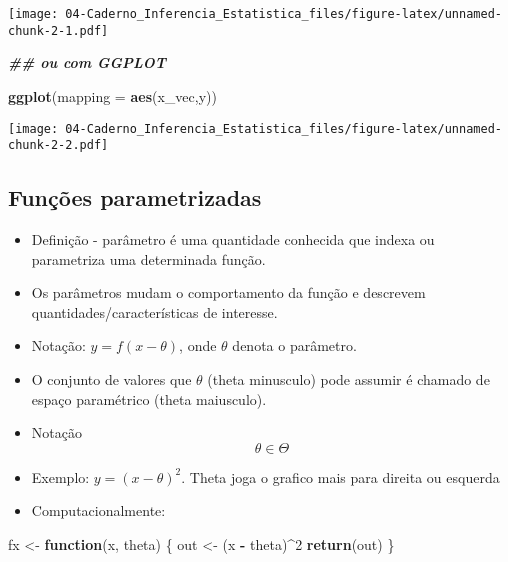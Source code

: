 \documentclass[
]{article}
\newenvironment{Shaded}{\begin{snugshade}}{\end{snugshade}}
\newcommand{\AttributeTok}[1]{\textcolor[rgb]{0.13,0.29,0.53}{#1}}
\newcommand{\ControlFlowTok}[1]{\textcolor[rgb]{0.13,0.29,0.53}{\textbf{#1}}}
\newcommand{\DecValTok}[1]{\textcolor[rgb]{0.00,0.00,0.81}{#1}}
\newcommand{\DocumentationTok}[1]{\textcolor[rgb]{0.56,0.35,0.01}{\textbf{\textit{#1}}}}
\newcommand{\FunctionTok}[1]{\textcolor[rgb]{0.13,0.29,0.53}{\textbf{#1}}}
\newcommand{\NormalTok}[1]{#1}
\newcommand{\OtherTok}[1]{\textcolor[rgb]{0.56,0.35,0.01}{#1}}
\newcommand{\SpecialCharTok}[1]{\textcolor[rgb]{0.81,0.36,0.00}{\textbf{#1}}}
\providecommand{\tightlist}{%
  \setlength{\itemsep}{0pt}\setlength{\parskip}{0pt}}
\begin{document}
\texttt{[image: 04-Caderno\_Inferencia\_Estatistica\_files/figure-latex/unnamed-chunk-2-1.pdf]}

\begin{Shaded}
\begin{Highlighting}[]
\DocumentationTok{\#\# ou com GGPLOT}

\FunctionTok{ggplot}\NormalTok{(}\AttributeTok{mapping =} \FunctionTok{aes}\NormalTok{(x\_vec,y))}
\end{Highlighting}
\end{Shaded}

\texttt{[image: 04-Caderno\_Inferencia\_Estatistica\_files/figure-latex/unnamed-chunk-2-2.pdf]}

\hypertarget{funuxe7uxf5es-parametrizadas}{%
\subsection{Funções parametrizadas}\label{funuxe7uxf5es-parametrizadas}}

\begin{itemize}
\tightlist
\item
  Definição - parâmetro é uma quantidade conhecida que indexa ou
  parametriza uma determinada função.
\item
  Os parâmetros mudam o comportamento da função e descrevem
  quantidades/características de interesse.
\item
  Notação: \(y = f(x - \theta)\), onde \(\theta\) denota o parâmetro.
\item
  O conjunto de valores que \(\theta\) (theta minusculo) pode assumir é
  chamado de espaço paramétrico (theta maiusculo).
\item
  Notação \[\theta \in \Theta \]
\item
  Exemplo: \(y = (x - \theta)^2\). Theta joga o grafico mais para
  direita ou esquerda
\item
  Computacionalmente:
\end{itemize}

\begin{Shaded}
\begin{Highlighting}[]
\NormalTok{fx }\OtherTok{\textless{}{-}} \ControlFlowTok{function}\NormalTok{(x, theta) \{}
\NormalTok{out }\OtherTok{\textless{}{-}}\NormalTok{ (x }\SpecialCharTok{{-}}\NormalTok{ theta)}\SpecialCharTok{\^{}}\DecValTok{2}
\FunctionTok{return}\NormalTok{(out)}
\NormalTok{\}}
\end{Highlighting}
\end{Shaded}
\end{document}
